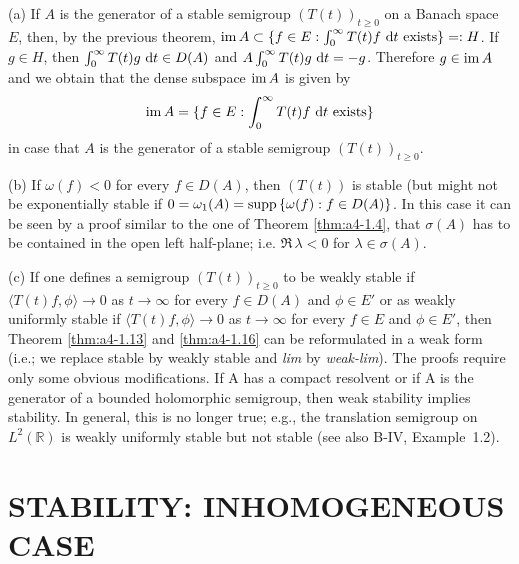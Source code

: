 \begin{remark}\label{rem:a4-1.17}
(a) If $A$ is the generator of a stable semigroup
$(T(t))_{t \geq 0}$ on a Banach space $E$, then, by the previous theorem,
$\mathop{}\!\mathrm{im}\, A \subset \{f \in E : \int_{0}^{\infty} T(t)f \,\mathop{}\!\mathrm{d}{t} \text{ exists}\} =: H$.
If $g \in H$, then $\int_{0}^{\infty} T(t)g \,\mathop{}\!\mathrm{d}{t} \in D(A)$ and $A \int_{0}^{\infty} T(t)g \,\mathop{}\!\mathrm{d}{t} = -g$. 
Therefore $g \in \mathop{}\!\mathrm{im}\, A$ and we obtain that the dense subspace $\mathop{}\!\mathrm{im}\, A$ is given
by
\begin{equation}\label{eq:a4-1.14}
\mathop{}\!\mathrm{im}\, A = \{f \in E : \int_{0}^{\infty} T(t)f \,\mathop{}\!\mathrm{d}{t} \text{ exists}\}
\end{equation}
in case that $A$ is the generator of a stable semigroup $(T(t))_{t \geq 0}$.

\bigskip
\noindent
(b) If $\omega(f) < 0$ for every $f \in D(A)$, then $(T(t))$ is stable (but
might not be exponentially stable if
$0 = \omega_{1}(A) = \mathop{}\!\mathrm{supp}\,\{\omega(f) : f \in D(A)\}$. 
In this case it can be seen by a
proof similar to the one of Theorem \ref{thm:a4-1.4}, that $\sigma(A)$ has to be contained
in the open left half-plane; i.e. $\Re\,\lambda < 0$ for $\lambda \in \sigma(A)$.

\bigskip
\noindent
(c) If one defines a semigroup $(T(t))_{t \geq 0}$ to be weakly stable if
$\langle T(t)f,\phi \rangle \to 0$ as $t \to \infty$ for every $f \in D(A)$ and $\phi \in E'$ or as
weakly uniformly stable if $\langle T(t)f,\phi \rangle \to 0$ as $t \to \infty$ for every $f \in E$
and $\phi \in E'$, then Theorem \ref{thm:a4-1.13} and \ref{thm:a4-1.16} can be reformulated in a weak form (i.e.; we replace stable by weakly stable and \emph{lim} by
\emph{weak-lim}). 
The proofs require only some obvious modifications.
If A has a compact resolvent or if A is the generator of a bounded
holomorphic semigroup, then weak stability implies stability. 
In general, this is no longer true; e.g., the translation semigroup on
$L^{2}(\mathbb{R})$ is weakly uniformly stable but not stable (see also
B-IV, Example~1.2).
\end{remark}

\section{STABILITY: INHOMOGENEOUS CASE}

